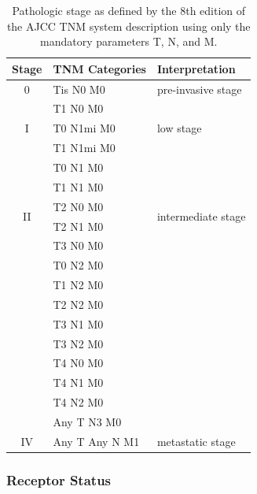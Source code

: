 \documentclass[11pt]{book}
\begin{document}
%
%
\begin{table}[t]
\centering
\caption[TNM Staging]{Pathologic stage as defined by the 8th edition of the AJCC TNM system description using only the mandatory parameters T, N, and M.}
\label{tab:stage}
\begin{tabular}{ cll }
\toprule
Stage & TNM Categories & Interpretation \\
\midrule
\multirow{1}{*}{0}   & Tis N0 M0      & \multirow{1}{*}{pre-invasive stage} \\[4pt]
\multirow{3}{*}{I}   & T1 N0 M0       & \multirow{3}{*}{low stage} \\
                     & T0 N1mi M0     & \\
                     & T1 N1mi M0     & \\[4pt]
\multirow{6}{*}{II}  & T0 N1 M0       & \multirow{6}{*}{intermediate stage} \\
                     & T1 N1 M0       & \\
                     & T2 N0 M0       & \\
                     & T2 N1 M0       & \\
                     & T3 N0 M0       & \\[4pt]
\multirow{9}{*}{III} & T0 N2 M0       & \multirow{9}{*}{high stage} \\
                     & T1 N2 M0       & \\
                     & T2 N2 M0       & \\
                     & T3 N1 M0       & \\
                     & T3 N2 M0       & \\
                     & T4 N0 M0       & \\
                     & T4 N1 M0       & \\
                     & T4 N2 M0       & \\
                     & Any T N3 M0    & \\[4pt]
\multirow{1}{*}{IV}  & Any T Any N M1 & \multirow{1}{*}{metastatic stage} \\
\bottomrule
\end{tabular}
\end{table}


\subsubsection{Receptor Status}
\end{document}
